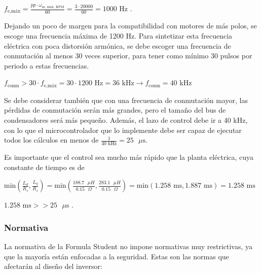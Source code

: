 \(f_{\text{e,máx}} = \frac{pp\cdot \omega_{\text{m, máx, RPM}}}{60} = \frac{3\cdot 20000}{60} = 1000 \text{ Hz .}\)

Dejando un poco de margen para la compatibilidad con motores de más polos, se escoge una frecuencia máxima de 1200 Hz. Para sintetizar esta frecuencia eléctrica con poca distorsión armónica, se debe escoger una frecuencia de conmutación al menos 30 veces superior, para tener como mínimo 30 pulsos por periodo a estas frecuencias.

\(f_{\text{conm}} > 30\cdot f_{\text{e,máx}} = 30\cdot1200 \text{ Hz} = 36 \text{ kHz} \rightarrow f_{\text{conm}} = 40 \text{ kHz}\)

Se debe considerar también que con una frecuencia de conmutación mayor, las pérdidas de conmutación serán más grandes, pero el tamaño del bus de condensadores será más pequeño. Además, el lazo de control debe ir a 40 kHz, con lo que el microcontrolador que lo implemente debe ser capaz de ejecutar todos los cálculos en menos de $\frac{1}{40 \text{ kHz}} = 25 \text{ }\mu\text{s}$.

Es importante que el control sea mucho más rápido que la planta eléctrica, cuya constante de tiempo es de

\(\text{min}(\frac{L_d}{R_s},\frac{L_q}{R_s}) = \text{min}(\frac{188.7 \text{ }\mu H}{0.15 \text{ }\Omega},\frac{283.1 \text{ }\mu H}{0.15 \text{ }\Omega}) = \text{min}(1.258 \text{ ms}, 1.887 \text{ ms}) = 1.258 \text{ ms}\)

\(1.258 \text{ ms} >> 25 \text{ }\mu\text{s .}\)

\subsubsection{Normativa}
La normativa de la Formula Student no impone normativas muy restrictivas, ya que la mayoría están enfocadas a la seguridad. Estas son las normas que afectarán al diseño del inversor:

